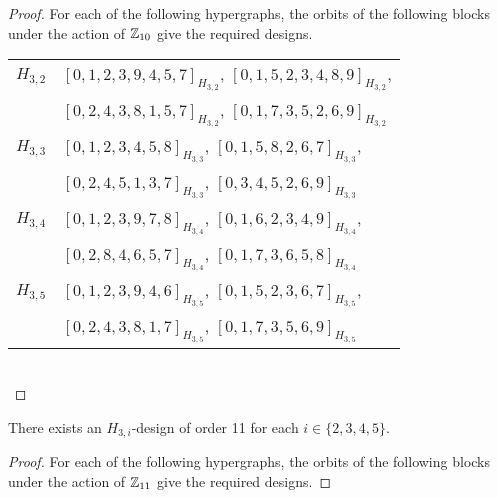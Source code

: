 \begin{subappendices}
\begin{proof}
For each of the following hypergraphs, the orbits of the following blocks under
the action of $\mathbb{Z}_{10}$ give the required designs.

\begin{tabular}{|c|l|}
\hline
$H_{3,2}$ &
  $[0, 1, 2, 3, 9, 4, 5, 7]_{H_{3,2}}$,
  $[0, 1, 5, 2, 3, 4, 8, 9]_{H_{3,2}}$, \\ &
  $[0, 2, 4, 3, 8, 1, 5, 7]_{H_{3,2}}$,
  $[0, 1, 7, 3, 5, 2, 6, 9]_{H_{3,2}}$
\\ \hline
$H_{3,3}$ &
  $[0, 1, 2, 3, 4, 5, 8]_{H_{3,3}}$,
  $[0, 1, 5, 8, 2, 6, 7]_{H_{3,3}}$, \\ &
  $[0, 2, 4, 5, 1, 3, 7]_{H_{3,3}}$,
  $[0, 3, 4, 5, 2, 6, 9]_{H_{3,3}}$
\\ \hline
$H_{3,4}$ &
  $[0, 1, 2, 3, 9, 7, 8]_{H_{3,4}}$,
  $[0, 1, 6, 2, 3, 4, 9]_{H_{3,4}}$, \\ &
  $[0, 2, 8, 4, 6, 5, 7]_{H_{3,4}}$,
  $[0, 1, 7, 3, 6, 5, 8]_{H_{3,4}}$
\\ \hline
$H_{3,5}$ &
  $[0, 1, 2, 3, 9, 4, 6]_{H_{3,5}}$,
  $[0, 1, 5, 2, 3, 6, 7]_{H_{3,5}}$, \\ &
  $[0, 2, 4, 3, 8, 1, 7]_{H_{3,5}}$,
  $[0, 1, 7, 3, 5, 6, 9]_{H_{3,5}}$
\\ \hline
\end{tabular}
\\
\end{proof}


\begin{example} \label{eg:H_3i-11}
There exists an $H_{3,i}$-design of order 11 for each $i \in \{2,3,4,5\}$.
\end{example}

\begin{proof}
For each of the following hypergraphs, the orbits of the following blocks under
the action of $\mathbb{Z}_{11}$ give the required designs.


\end{proof}
\end{subappendices}
